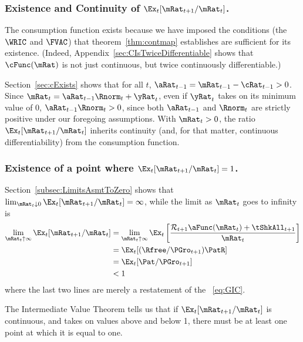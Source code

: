\documentclass[BufferStockTheory]{subfiles}
\begin{document}
\subsubsection{Existence and Continuity of $\Ex_t [{\mRat}_{t+1}/\mRat_t]$.}
The consumption function exists because we have imposed the conditions (the $\WRIC$ and $\FVAC$) that theorem~\ref{thm:contmap} establishes are sufficient for its existence.  (Indeed, Appendix~\ref{sec:CIsTwiceDifferentiable} shows that $\cFunc(\mRat)$ is not just continuous, but twice continuously differentiable.)

Section~\ref{sec:cExists} shows that for all $t$, $\aRat_{t-1} = {\mRat}_{t-1} -  \cRat_{t-1} > 0$.  Since ${\mRat}_{t}= {\aRat}_{t-1} \Rnorm_{t} + \yRat_{t}$, even if $\yRat_{t}$ takes on its minimum value of 0, $\aRat_{t-1} \Rnorm_{t} > 0$, since both $\aRat_{t-1}$ and $\Rnorm_{t}$ are strictly positive under our foregoing assumptions.  With $\mRat_{t} > 0$, the ratio $\Ex_t [{\mRat}_{t+1}/\mRat_t]$ inherits continuity (and, for that matter, continuous differentiability) from the consumption function.

\subsubsection{Existence of a point where $\Ex_t [{\mRat}_{t+1}/\mRat_t]=1$.}
Section~\ref{subsec:LimitsAsmtToZero} shows that $\lim_{\mRat_t \downarrow 0} 
\Ex_t [{\mRat}_{t+1}/\mRat_t] = \infty$, while the limit as $\mRat_{t}$ goes 
to infinity is
\begin{equation}\begin{gathered}\begin{aligned}
  \lim_{\mRat_{t} \uparrow \infty} \Ex_{t}[{\mRat}_{t+1}/\mRat_{t}]  & =   
                                                                       \lim_{\mRat_{t} \uparrow \infty} 
                                                                       \Ex_{t}\left[\frac{{\mathcal{\mathcal{R}}}_{t+1}\aFunc(\mRat_{t})+{\tShkAll}_{t+1}}{\mRat_{t}}\right] \notag 
  \\  & = \Ex_{t}[(\Rfree/{\PGro}_{t+1})\PatR]
  \\  & = \Ex_{t}[{\Pat}/{\PGro}_{t+1}] \notag
  \\  & < 1 \notag
\end{aligned}\end{gathered}\end{equation}
where the last two lines are merely a restatement of the \GIC~\eqref{eq:GIC}.

The Intermediate Value Theorem tells us that if $\Ex_t [{\mRat}_{t+1}/\mRat_t]$ is continuous, and takes on values above and below 1, there must be at least one point at which it is equal to one.
\end{document}
